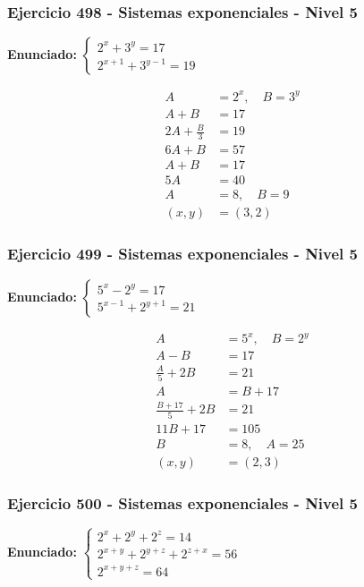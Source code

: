 \documentclass[12pt,a4paper]{article}
\begin{document}
\subsubsection*{Ejercicio 498 - Sistemas exponenciales - Nivel 5}
\textbf{Enunciado:} \(\begin{cases}2^x+3^y=17\\ 2^{x+1}+3^{y-1}=19\end{cases}\)

\[
\begin{aligned}
A&=2^x,
\quad B=3^y\\
A+B&=17\\
2A+\frac{B}{3}&=19\\
6A+B&=57\\
A+B&=17\\
5A&=40\\
A&=8,
\quad B=9\\
(x,y)&=\boxed{(3,2)}
\end{aligned}
\]


\subsubsection*{Ejercicio 499 - Sistemas exponenciales - Nivel 5}
\textbf{Enunciado:} \(\begin{cases}5^x-2^y=17\\ 5^{x-1}+2^{y+1}=21\end{cases}\)

\[
\begin{aligned}
A&=5^x,
\quad B=2^y\\
A-B&=17\\
\frac{A}{5}+2B&=21\\
A&=B+17\\
\frac{B+17}{5}+2B&=21\\
11B+17&=105\\
B&=8,
\quad A=25\\
(x,y)&=\boxed{(2,3)}
\end{aligned}
\]


\subsubsection*{Ejercicio 500 - Sistemas exponenciales - Nivel 5}
\textbf{Enunciado:} \(\begin{cases}2^x+2^y+2^z=14\\ 2^{x+y}+2^{y+z}+2^{z+x}=56\\ 2^{x+y+z}=64\end{cases}\)
\end{document}
